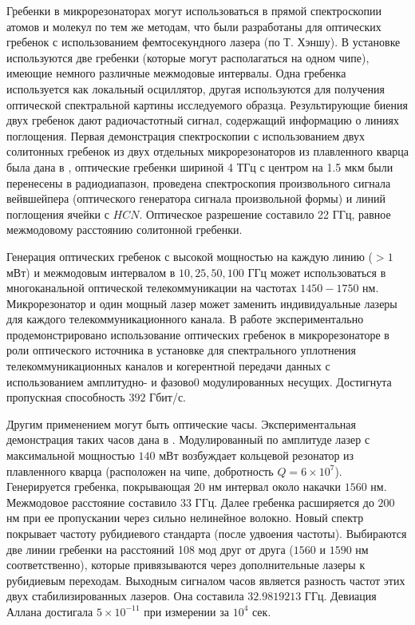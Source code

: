 Гребенки в микрорезонаторах могут использоваться в прямой спектроскопии атомов и молекул по тем же методам, что были разработаны для оптических гребенок с использованием фемтосекундного лазера (по Т. Хэншу). В установке используются две гребенки (которые могут располагаться на одном чипе), имеющие немного различные межмодовые интервалы. Одна гребенка используется как локальный осциллятор, другая используются для получения оптической спектральной картины исследуемого образца. Результирующие биения двух гребенок дают радиочастотный сигнал, содержащий информацию о линиях поглощения. Первая демонстрация спектроскопии с использованием двух солитонных гребенок из двух отдельных микрорезонаторов из плавленного кварца была дана в \cite{Suh2016}, оптические гребенки шириной 4 ТГц с центром на 1.5 мкм были перенесены в радиодиапазон, проведена спектроскопия произвольного сигнала вейвшейпера (оптического генератора сигнала произвольной формы) и линий поглощения ячейки с $HCN$. Оптическое разрешение составило 22 ГГц, равное межмодовому расстоянию солитонной гребенки.

Генерация оптических гребенок с высокой мощностью на каждую линию ($>1$ мВт) и межмодовым интервалом в $10,25,50,100$ ГГц может использоваться в многоканальной оптической телекоммуникации на частотах $1450-1750$ нм. Микрорезонатор и один мощный лазер может заменить индивидуальные лазеры для каждого телекоммуникационного канала. В работе \cite{Pfeifle2014} экспериментально продемонстрировано использование оптических гребенок в микрорезонаторе в роли оптического источника в установке для спектрального уплотнения телекоммуникационных каналов и когерентной передачи данных с использованием амплитудно- и фазово0 модулированных несущих. Достигнута пропускная способность $392$ Гбит/с.

Другим применением могут быть оптические часы. Экспериментальная демонстрация таких часов дана в \cite{Papp2014}. Модулированный по амплитуде лазер с максимальной мощностью $140$ мВт возбуждает кольцевой резонатор из плавленного кварца (расположен на чипе, добротность $Q=6\times10^7$). Генерируется гребенка, покрывающая $20$ нм интервал около накачки $1560$ нм. Межмодовое расстояние составило $33$ ГГц. Далее гребенка расширяется до $200$ нм при ее пропускании через сильно нелинейное волокно. Новый спектр покрывает частоту рубидиевого стандарта (после удвоения частоты). Выбираются две линии гребенки на расстояний 108 мод друг от друга ($1560$ и $1590$ нм соответственно), которые привязываются через дополнительные лазеры к рубидиевым переходам. Выходным сигналом часов является разность частот этих двух стабилизированных лазеров. Она составила $32.9819213$ ГГц. Девиация Аллана достигала $5\times10^{-11}$ при измерении за $10^4$ сек.

